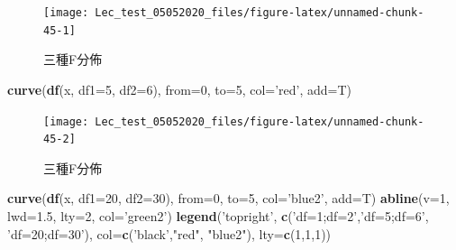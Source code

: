 \documentclass[hyperref,]{ctexart}
\newenvironment{Shaded}{\begin{snugshade}}{\end{snugshade}}
\newcommand{\DataTypeTok}[1]{\textcolor[rgb]{0.13,0.29,0.53}{#1}}
\newcommand{\DecValTok}[1]{\textcolor[rgb]{0.00,0.00,0.81}{#1}}
\newcommand{\FloatTok}[1]{\textcolor[rgb]{0.00,0.00,0.81}{#1}}
\newcommand{\KeywordTok}[1]{\textcolor[rgb]{0.13,0.29,0.53}{\textbf{#1}}}
\newcommand{\NormalTok}[1]{#1}
\newcommand{\StringTok}[1]{\textcolor[rgb]{0.31,0.60,0.02}{#1}}
\begin{document}
\begin{figure}

\texttt{[image: Lec\_test\_05052020\_files/figure-latex/unnamed-chunk-45-1]} \hfill{}

\caption{\label{fig:fcurve}三種F分佈}\label{fig:unnamed-chunk-451}
\end{figure}

\begin{Shaded}
\begin{Highlighting}[]
\KeywordTok{curve}\NormalTok{(}\KeywordTok{df}\NormalTok{(x, }\DataTypeTok{df1=}\DecValTok{5}\NormalTok{, }\DataTypeTok{df2=}\DecValTok{6}\NormalTok{), }\DataTypeTok{from=}\DecValTok{0}\NormalTok{, }\DataTypeTok{to=}\DecValTok{5}\NormalTok{, }\DataTypeTok{col=}\StringTok{'red'}\NormalTok{, }\DataTypeTok{add=}\NormalTok{T)}
\end{Highlighting}
\end{Shaded}

\begin{figure}

\texttt{[image: Lec\_test\_05052020\_files/figure-latex/unnamed-chunk-45-2]} \hfill{}

\caption{\label{fig:fcurve}三種F分佈}\label{fig:unnamed-chunk-452}
\end{figure}

\begin{Shaded}
\begin{Highlighting}[]
\KeywordTok{curve}\NormalTok{(}\KeywordTok{df}\NormalTok{(x, }\DataTypeTok{df1=}\DecValTok{20}\NormalTok{, }\DataTypeTok{df2=}\DecValTok{30}\NormalTok{), }\DataTypeTok{from=}\DecValTok{0}\NormalTok{, }\DataTypeTok{to=}\DecValTok{5}\NormalTok{, }\DataTypeTok{col=}\StringTok{'blue2'}\NormalTok{, }\DataTypeTok{add=}\NormalTok{T)}
\KeywordTok{abline}\NormalTok{(}\DataTypeTok{v=}\DecValTok{1}\NormalTok{, }\DataTypeTok{lwd=}\FloatTok{1.5}\NormalTok{, }\DataTypeTok{lty=}\DecValTok{2}\NormalTok{, }\DataTypeTok{col=}\StringTok{'green2'}\NormalTok{)}
\KeywordTok{legend}\NormalTok{(}\StringTok{'topright'}\NormalTok{, }\KeywordTok{c}\NormalTok{(}\StringTok{'df=1;df=2'}\NormalTok{,}\StringTok{'df=5;df=6'}\NormalTok{,}
                     \StringTok{'df=20;df=30'}\NormalTok{),}
            \DataTypeTok{col=}\KeywordTok{c}\NormalTok{(}\StringTok{'black'}\NormalTok{,}\StringTok{"red"}\NormalTok{, }\StringTok{"blue2"}\NormalTok{),}
            \DataTypeTok{lty=}\KeywordTok{c}\NormalTok{(}\DecValTok{1}\NormalTok{,}\DecValTok{1}\NormalTok{,}\DecValTok{1}\NormalTok{))}
\end{Highlighting}
\end{Shaded}
\end{document}
